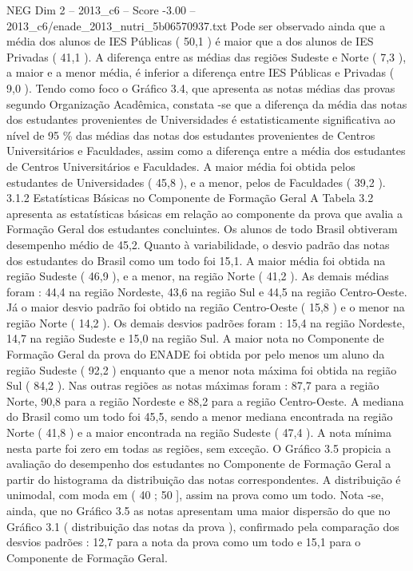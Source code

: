 \begin{textsample}{NEG Dim 2 – 2013\_c6 – Score -3.00 – 2013\_c6/enade\_2013\_nutri\_5b06570937.txt}
Pode ser observado ainda que a média dos alunos de IES Públicas ( 50,1 ) é maior que a dos alunos de IES Privadas ( 41,1 ).
A diferença entre as médias das regiões Sudeste e Norte ( 7,3 ), a maior e a menor média, é inferior a diferença entre IES Públicas e Privadas ( 9,0 ).
Tendo como foco o Gráfico 3.4, que apresenta as notas médias das provas segundo Organização Acadêmica, constata -se que a diferença da média das notas dos estudantes provenientes de Universidades é estatisticamente significativa ao nível de 95 \% das médias das notas dos estudantes provenientes de Centros Universitários e Faculdades, assim como a diferença entre a média dos estudantes de Centros Universitários e Faculdades.
A maior média foi obtida pelos estudantes de Universidades ( 45,8 ), e a menor, pelos de Faculdades ( 39,2 ). 3.1.2 Estatísticas Básicas no Componente de Formação Geral A Tabela 3.2 apresenta as estatísticas básicas em relação ao componente da prova que avalia a Formação Geral dos estudantes concluintes.
Os alunos de todo Brasil obtiveram desempenho médio de 45,2.
Quanto à variabilidade, o desvio padrão das notas dos estudantes do Brasil como um todo foi 15,1.
A maior média foi obtida na região Sudeste ( 46,9 ), e a menor, na região Norte ( 41,2 ).
As demais médias foram : 44,4 na região Nordeste, 43,6 na região Sul e 44,5 na região Centro-Oeste.
Já o maior desvio padrão foi obtido na região Centro-Oeste ( 15,8 ) e o menor na região Norte ( 14,2 ).
Os demais desvios padrões foram : 15,4 na região Nordeste, 14,7 na região Sudeste e 15,0 na região Sul.
A maior nota no Componente de Formação Geral da prova do ENADE foi obtida por pelo menos um aluno da região Sudeste ( 92,2 ) enquanto que a menor nota máxima foi obtida na região Sul ( 84,2 ).
Nas outras regiões as notas máximas foram : 87,7 para a região Norte, 90,8 para a região Nordeste e 88,2 para a região Centro-Oeste.
A mediana do Brasil como um todo foi 45,5, sendo a menor mediana encontrada na região Norte ( 41,8 ) e a maior encontrada na região Sudeste ( 47,4 ).
A nota mínima nesta parte foi zero em todas as regiões, sem exceção.
O Gráfico 3.5 propicia a avaliação do desempenho dos estudantes no Componente de Formação Geral a partir do histograma da distribuição das notas correspondentes.
A distribuição é unimodal, com moda em ( 40 ; 50 ], assim na prova como um todo.
Nota -se, ainda, que no Gráfico 3.5 as notas apresentam uma maior dispersão do que no Gráfico 3.1 ( distribuição das notas da prova ), confirmado pela comparação dos desvios padrões : 12,7 para a nota da prova como um todo e 15,1 para o Componente de Formação Geral.

\end{textsample}
